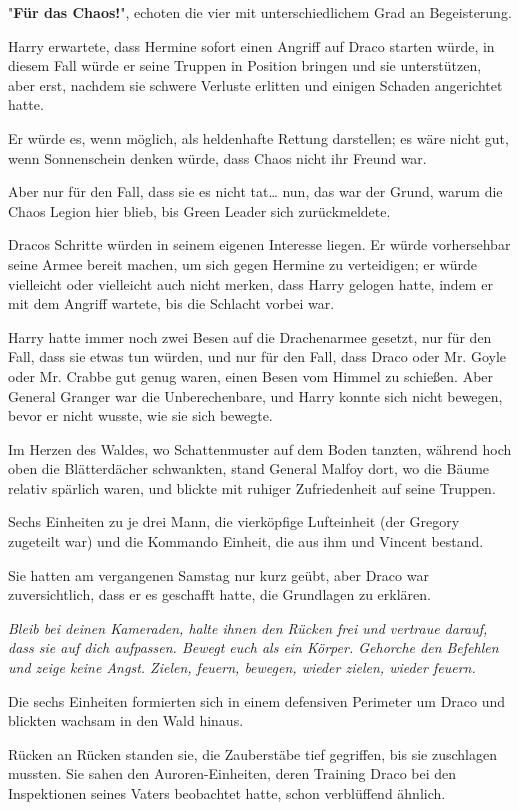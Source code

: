{"\textbf{Für das Chaos!}", echoten die vier mit unterschiedlichem Grad an Begeisterung.

Harry erwartete, dass Hermine sofort einen Angriff auf Draco starten würde, in diesem Fall würde er seine Truppen in Position bringen und sie unterstützen, aber erst, nachdem sie schwere Verluste erlitten und einigen Schaden angerichtet hatte.

Er würde es, wenn möglich, als heldenhafte Rettung darstellen; es wäre nicht gut, wenn Sonnenschein denken würde, dass Chaos nicht ihr Freund war.

Aber nur für den Fall, dass sie es nicht tat… nun, das war der Grund, warum die Chaos Legion hier blieb, bis Green Leader sich zurückmeldete.

Dracos Schritte würden in seinem eigenen Interesse liegen. Er würde vorhersehbar seine Armee bereit machen, um sich gegen Hermine zu verteidigen; er würde vielleicht oder vielleicht auch nicht merken, dass Harry gelogen hatte, indem er mit dem Angriff wartete, bis die Schlacht vorbei war.

Harry hatte immer noch zwei Besen auf die Drachenarmee gesetzt, nur für den Fall, dass sie etwas tun würden, und nur für den Fall, dass Draco oder Mr. Goyle oder Mr. Crabbe gut genug waren, einen Besen vom Himmel zu schießen. Aber General Granger war die Unberechenbare, und Harry konnte sich nicht bewegen, bevor er nicht wusste, wie sie sich bewegte.

Im Herzen des Waldes, wo Schattenmuster auf dem Boden tanzten, während hoch oben die Blätterdächer schwankten, stand General Malfoy dort, wo die Bäume relativ spärlich waren, und blickte mit ruhiger Zufriedenheit auf seine Truppen.

Sechs Einheiten zu je drei Mann, die vierköpfige Lufteinheit (der Gregory zugeteilt war) und die Kommando Einheit, die aus ihm und Vincent bestand.

Sie hatten am vergangenen Samstag nur kurz geübt, aber Draco war zuversichtlich, dass er es geschafft hatte, die Grundlagen zu erklären.

\emph{Bleib bei deinen Kameraden, halte ihnen den Rücken frei und vertraue darauf, dass sie auf dich aufpassen. Bewegt euch als ein Körper. Gehorche den Befehlen und zeige keine Angst. Zielen, feuern, bewegen, wieder zielen, wieder feuern.}

Die sechs Einheiten formierten sich in einem defensiven Perimeter um Draco und blickten wachsam in den Wald hinaus.

Rücken an Rücken standen sie, die Zauberstäbe tief gegriffen, bis sie zuschlagen mussten. Sie sahen den Auroren-Einheiten, deren Training Draco bei den Inspektionen seines Vaters beobachtet hatte, schon verblüffend ähnlich.

}
